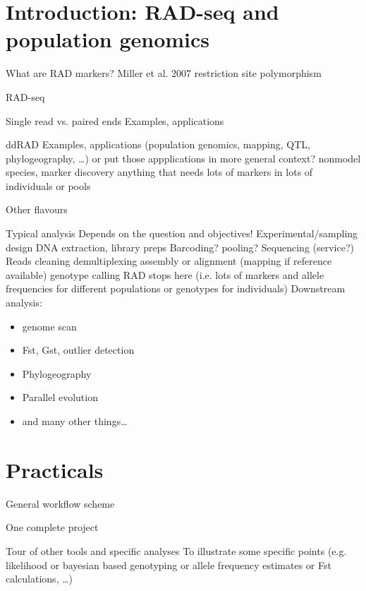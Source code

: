 \documentclass[big]{beamer}
\begin{document}
\section{Introduction: RAD-seq and population genomics}
\label{sec-2}

\begin{frame}[label=sec-2-1]{What are RAD markers?}
Miller et al. 2007
restriction site polymorphism
\end{frame}
\begin{frame}[label=sec-2-2]{RAD-seq}
\end{frame}

\begin{frame}[label=sec-2-3]{Single read vs. paired ends}
Examples, applications
\end{frame}
\begin{frame}[label=sec-2-4]{ddRAD}
Examples, applications
(population genomics, mapping, QTL, phylogeography, \ldots{})
or put those appplications in more general context?
nonmodel species, marker discovery
anything that needs lots of markers in lots of individuals or pools
\end{frame}
\begin{frame}[label=sec-2-5]{Other flavours}
\end{frame}

\begin{frame}[label=sec-2-6]{Typical analysis}
Depends on the question and objectives!
Experimental/sampling design
DNA extraction, library preps
Barcoding? pooling?
Sequencing (service?)
Reads cleaning
demultiplexing
assembly or alignment (mapping if reference available)
genotype calling
RAD stops here (i.e. lots of markers and allele frequencies for different populations or genotypes for individuals)
Downstream analysis:
\begin{itemize}
\item genome scan
\item Fst, Gst, outlier detection
\item Phylogeography
\item Parallel evolution
\item and many other things\ldots{}
\end{itemize}
\end{frame}
\section{Practicals}
\label{sec-3}

\begin{frame}[label=sec-3-1]{General workflow scheme}
\end{frame}

\begin{frame}[label=sec-3-2]{One complete project}
\end{frame}

\begin{frame}[label=sec-3-3]{Tour of other tools and specific analyses}
To illustrate some specific points (e.g. likelihood or bayesian based genotyping
or allele frequency estimates or Fst calculations, \ldots{})
\end{frame}
\end{document}
